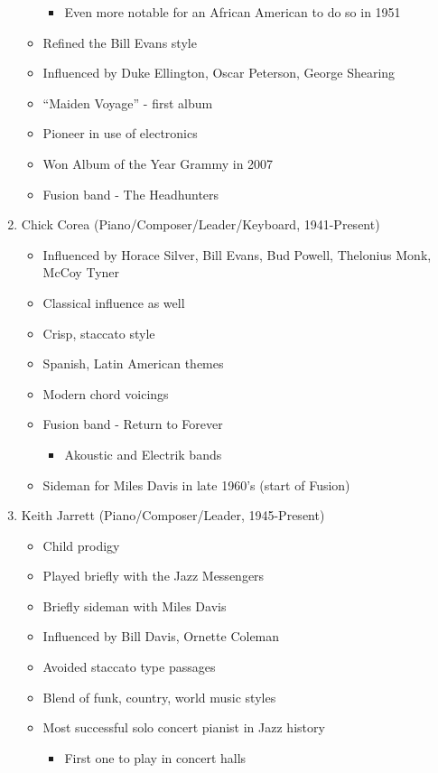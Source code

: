 \documentclass[]{article}
\providecommand{\tightlist}{%
  \setlength{\itemsep}{0pt}\setlength{\parskip}{0pt}}
\begin{document}
\begin{enumerate}
\begin{itemize}
    \begin{itemize}
    \tightlist
    \item
      Even more notable for an African American to do so in 1951
    \end{itemize}
  \item
    Refined the Bill Evans style
  \item
    Influenced by Duke Ellington, Oscar Peterson, George Shearing
  \item
    ``Maiden Voyage'' - first album
  \item
    Pioneer in use of electronics
  \item
    Won Album of the Year Grammy in 2007
  \item
    Fusion band - The Headhunters
  \end{itemize}
\item
  Chick Corea (Piano/Composer/Leader/Keyboard, 1941-Present)

  \begin{itemize}
  \tightlist
  \item
    Influenced by Horace Silver, Bill Evans, Bud Powell, Thelonius Monk,
    McCoy Tyner
  \item
    Classical influence as well
  \item
    Crisp, staccato style
  \item
    Spanish, Latin American themes
  \item
    Modern chord voicings
  \item
    Fusion band - Return to Forever

    \begin{itemize}
    \tightlist
    \item
      Akoustic and Electrik bands
    \end{itemize}
  \item
    Sideman for Miles Davis in late 1960's (start of Fusion)
  \end{itemize}
\item
  Keith Jarrett (Piano/Composer/Leader, 1945-Present)

  \begin{itemize}
  \tightlist
  \item
    Child prodigy
  \item
    Played briefly with the Jazz Messengers
  \item
    Briefly sideman with Miles Davis
  \item
    Influenced by Bill Davis, Ornette Coleman
  \item
    Avoided staccato type passages
  \item
    Blend of funk, country, world music styles
  \item
    Most successful solo concert pianist in Jazz history

    \begin{itemize}
    \tightlist
    \item
      First one to play in concert halls
    \end{itemize}
  \end{itemize}
\end{enumerate}
\end{document}
